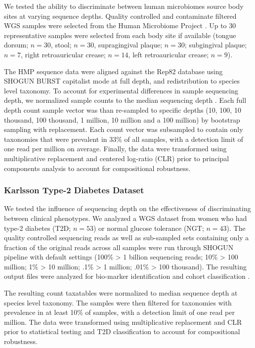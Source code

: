 We tested the ability to discriminate between human microbiomes source body sites at varying sequence depths. Quality controlled and contaminate filtered WGS samples were selected from the Human Microbiome Project \cite{consortium_structure_2012}. Up to 30 representative samples were selected from each body site if available (tongue dorsum; $n = 30$, stool; $n = 30$, supragingival plaque; $n = 30$; subgingival plaque; $n = 7$, right retroauricular crease; $n=14$, left retroauricular crease; $n = 9$).

The HMP sequence data were aligned against the Rep82 database using SHOGUN BURST capitalist mode at full depth, and redistribution to species level taxonomy. To account for experimental differences in sample sequencing depth, we normalized sample counts to the median sequencing depth \cite{mcmurdie_waste_2014}. Each full depth count sample vector was than re-sampled to specific depths (10, 100, 10 thousand, 100 thousand, 1 million, 10 million and a 100 million) by bootstrap sampling with replacement. Each count vector was subsampled to contain only taxonomies that were prevalent in 33\% of all samples, with a detection limit of one read per million on average. Finally, the data were transformed using multiplicative replacement and centered log-ratio (CLR) \cite{martin-fernandez_dealing_2003} prior to principal components analysis \cite{wold_principal_1987} to account for compositional robustness.

\subsubsection{Karlsson Type-2 Diabetes Dataset}

We tested the influence of sequencing depth on the effectiveness of discriminating between clinical phenotypes. We analyzed a WGS dataset from women who had type-2 diabetes (T2D; $n=53$) or normal glucose tolerance (NGT; $n=43$). The quality controlled sequencing reads as well as sub-sampled sets containing only a fraction of the original reads across all samples were run through SHOGUN pipeline with default settings (100\% > 1 billion sequencing reads; 10\% > 100 million; 1\% > 10 million; .1\% > 1 million; .01\% > 100 thousand). The resulting output files were analyzed for bio-marker identification and cohort classification \cite{karlsson_gut_2013}.

The resulting count taxatables were normalized to median sequence depth at species level taxonomy. The samples were then filtered for taxonomies with prevalence in at least 10\% of samples, with a detection limit of one read per million. The data were transformed using multiplicative replacement and CLR prior to statistical testing and T2D classification to account for compositional robustness.

